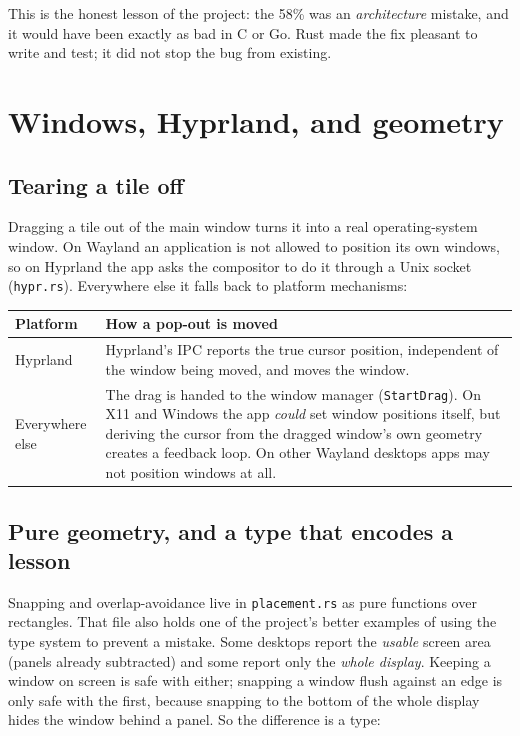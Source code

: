 \documentclass[11pt,a4paper]{article}
\newcommand{\code}[1]{\texttt{#1}}
\newcommand{\file}[1]{\texttt{#1}}
\begin{document}
This is the honest lesson of the project: the 58\% was an \emph{architecture} mistake, and it
would have been exactly as bad in C or Go. Rust made the fix pleasant to write and test; it did
not stop the bug from existing.

\section{Windows, Hyprland, and geometry}

\subsection{Tearing a tile off}

Dragging a tile out of the main window turns it into a real operating-system window. On
Wayland an application is not allowed to position its own windows, so on Hyprland the app asks
the compositor to do it through a Unix socket (\file{hypr.rs}). Everywhere else it falls back
to platform mechanisms:

\begin{center}
\small
\begin{tabular}{@{}p{3.2cm}p{11cm}@{}}
\toprule
Platform & How a pop-out is moved \\
\midrule
Hyprland & Hyprland's IPC reports the true cursor position, independent of the window being moved, and moves the window. \\
Everywhere else & The drag is handed to the window manager (\code{StartDrag}). On X11 and Windows the app \emph{could} set window positions itself, but deriving the cursor from the dragged window's own geometry creates a feedback loop. On other Wayland desktops apps may not position windows at all. \\
\bottomrule
\end{tabular}
\end{center}

\subsection{Pure geometry, and a type that encodes a lesson}

Snapping and overlap-avoidance live in \file{placement.rs} as pure functions over rectangles.
That file also holds one of the project's better examples of using the type system to prevent
a mistake. Some desktops report the \emph{usable} screen area (panels already subtracted) and
some report only the \emph{whole display}. Keeping a window on screen is safe with either;
snapping a window flush against an edge is only safe with the first, because snapping to the
bottom of the whole display hides the window behind a panel. So the difference is a type:
\end{document}

